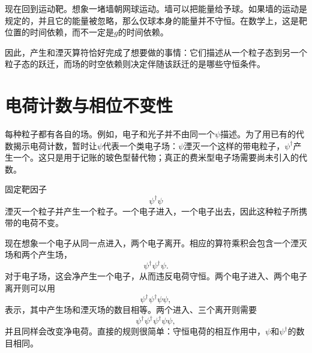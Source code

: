 \begin{classroomqa}
\end{classroomqa}

现在回到运动靶。想象一堵墙朝网球运动。墙可以把能量给予球。如果墙的运动是规定的，并且它的能量被忽略，那么仅球本身的能量并不守恒。在数学上，这是靶位置的时间依赖，而不一定是\(g\)的时间依赖。

因此，产生和湮灭算符恰好完成了想要做的事情：它们描述从一个粒子态到另一个粒子态的跃迁，而场的时空依赖则决定伴随该跃迁的是哪些守恒条件。

\section{电荷计数与相位不变性}

每种粒子都有各自的场。例如，电子和光子并不由同一个\(\psi\)描述。为了用已有的代数揭示电荷计数，暂时让\(\psi\)代表一个类电子场：\(\psi\)湮灭一个这样的带电粒子，\(\psi^\dagger\)产生一个。这只是用于记账的玻色型替代物；真正的费米型电子场需要尚未引入的代数。

固定靶因子
\begin{equation}
\psi^\dagger\psi
\end{equation}
湮灭一个粒子并产生一个粒子。一个电子进入，一个电子出去，因此这种粒子所携带的电荷不变。

现在想象一个电子从同一点进入，两个电子离开。相应的算符乘积会包含一个湮灭场和两个产生场，
\begin{equation}
\psi^\dagger\psi^\dagger\psi.
\end{equation}
对于电子场，这会净产生一个电子，从而违反电荷守恒。两个电子进入、两个电子离开则可以用
\begin{equation}
\psi^\dagger\psi^\dagger\psi\psi,
\end{equation}
表示，其中产生场和湮灭场的数目相等。两个进入、三个离开则需要
\begin{equation}
\psi^\dagger\psi^\dagger\psi^\dagger\psi\psi,
\end{equation}
并且同样会改变净电荷。直接的规则很简单：守恒电荷的相互作用中，\(\psi\)和\(\psi^\dagger\)的数目相同。

\begin{classroomqa}
\end{classroomqa}

